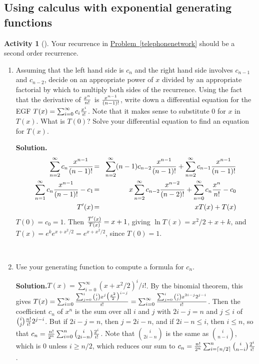 \documentclass[10pt,]{book}
\theoremstyle{plain}
\theoremstyle{definition}
\newtheorem{activity}[project]{Activity}
\numberwithin{equation}{chapter}
\newcommand{\amp}{&}
\begin{document}
\typeout{************************************************}
\typeout{************************************************}
\subsection[{Using calculus  with exponential generating functions}]{Using calculus  with exponential generating functions}\label{subsection-15}
\begin{activity}[]\label{activity-91}
Your recurrence in \hyperref[telephonenetwork]{Problem~\ref{telephonenetwork}} should be a second order recurrence.%
~\par
\begin{enumerate}[label=(\alph*)]
 \item Assuming that the left hand side is \(c_n\) and the right hand side involves \(c_{n-1}\) and \(c_{n-2}\), decide on an appropriate power of \(x\) divided by an appropriate factorial by which to multiply both sides of the recurrence.  Using the fact that the derivative of \(x^n\over n!\) is \(x^{n-1}\over (n-1)!\), write down a differential equation for the EGF \(T(x) =
\sum_{i=0}^\infty c_i{x^i\over i!}\).  Note that it makes sense to substitute 0 for \(x\) in \(T(x)\).  What is \(T(0)\)?  Solve your differential equation to find an equation for \(T(x)\).%
\par\medskip\noindent%
\textbf{Solution.}\quad %
\begin{align*}
\sum_{n=2}^\infty c_n{x^{n-1}\over (n-1)!}
\!\amp =\amp \!\sum_{n=2}^\infty(n-1) c_{n-2}{x^{n-1}\over (n-1)!} +
\sum_{n=2}^\infty c_{n-1}{x^{n-1}\over (n-1)!}\\
\sum_{n=1}^\infty c_n{x^{n-1}\over (n-1)!}- c_1 \!\amp =\amp \! x\sum_{n=2}^\infty
c_{n-2}{x^{n-2}\over (n-2)!} + \sum_{n=0}^\infty c_n{x^n\over n!} -c_0\\
T'(x)\!\amp =\amp \!xT(x) +T(x)
\end{align*}
\(T(0) = c_0 =1\). Then \({T'(x)\over T(x)} = x+1\), giving \(\ln T(x)
=x^2/2+x+k\), and \(T(x) =e^ke^{x+ x^2/2}=e^{x+x^2/2 }\), since \(T(0)=1\).%

~\par
\item Use your generating function to compute a formula for \(c_n\).%
\par\medskip\noindent%
\textbf{Solution.}\quad \(T(x) = \sum_{i=0}^\infty (x+x^2/2)^i/i!\). By the binomial theorem, this gives \(T(x) = \sum_{i=0}^\infty {\sum_{j=0}^i {i\choose
j}x^j\bigl({x^2\over2}\bigr)^{i-j}\over
i!}=\sum_{i=0}^\infty{\sum_{j=0}^i{i\choose j}x^{2i-j}2^{j-i}\over i!}\). Then the coefficient \(c_n\) of \(x^n\) is the sum over all \(i\) and \(j\) with \(2i-j=n\) and \(j\le i\) of \({i\choose j}{n!\over i!}2^{j-i}\). But if \(2i-j=n\), then \(j= 2i-n\), and if \(2i-n\le i\), then \(i\le n\), so that \(c_n
= {n!\over 2^n}\sum_{i=0}^n{i\choose 2i-n}{2^i\over i!}\). Note that \(i\choose 2i-n\) is the same as \(i\choose n-i\), which is 0 unless \(i\ge
n/2\), which reduces our sum to \(c_n = {n!\over
2^n}\sum_{i=\lceil n/2\rceil}^n{i\choose n-i}{2^i\over i!}\).%

\end{enumerate}
\end{activity}
\end{document}
